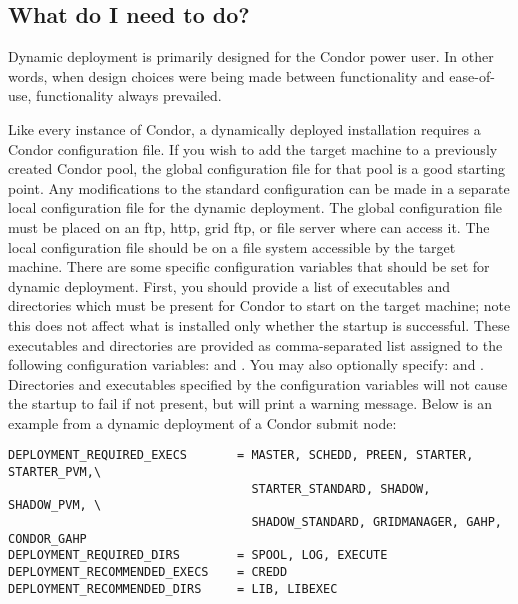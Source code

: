 \subsection{What do I need to do?}

Dynamic deployment is primarily designed for the Condor power user.
In other words, when design choices were being made between
functionality and ease-of-use, functionality always prevailed.

Like every instance of Condor, a dynamically deployed installation
requires a Condor configuration file.  If you wish to add the target
machine to a previously created Condor pool, the global configuration
file for that pool is a good starting point.  Any modifications to the
standard configuration can be made in a separate local configuration
file for the dynamic deployment.  The global configuration file must
be placed on an ftp, http, grid ftp, or file server where
 can access it.  The local configuration file
should be on a file system accessible by the target machine.  There
are some specific configuration variables that should be set for
dynamic deployment.  First, you should provide a list of executables
and directories which must be present for Condor to start on the
target machine; note this does not affect what is installed only
whether the startup is successful.  These executables and directories
are provided as comma-separated list assigned to the following
configuration variables:  and
.  You may also optionally specify:
 and
.  Directories and executables
specified by the  configuration variables will
not cause the startup to fail if not present, but will print a warning
message.  Below is an example from a dynamic deployment of a Condor
submit node:

\footnotesize
\begin{verbatim}
DEPLOYMENT_REQUIRED_EXECS       = MASTER, SCHEDD, PREEN, STARTER, STARTER_PVM,\
                                  STARTER_STANDARD, SHADOW, SHADOW_PVM, \
                                  SHADOW_STANDARD, GRIDMANAGER, GAHP, CONDOR_GAHP
DEPLOYMENT_REQUIRED_DIRS        = SPOOL, LOG, EXECUTE
DEPLOYMENT_RECOMMENDED_EXECS    = CREDD
DEPLOYMENT_RECOMMENDED_DIRS     = LIB, LIBEXEC
\end{verbatim}
\normalsize

